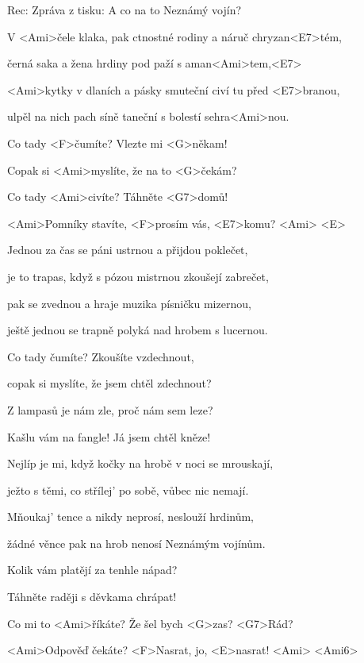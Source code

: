 

Rec: Zpráva z tisku:  A co na to Neznámý vojín?

\zs
V <Ami>čele klaka, pak ctnostné rodiny a náruč chryzan<E7>tém,

černá saka a žena hrdiny pod paží s aman<Ami>tem,<E7>

<Ami>kytky v dlaních a pásky smuteční civí tu před <E7>branou,

ulpěl na nich pach síně taneční s bolestí sehra<Ami>nou.
\ks

\zr
Co tady <F>čumíte? Vlezte mi <G>někam!

Copak si <Ami>myslíte, že na to <G>čekám?

Co tady <Ami>civíte? Táhněte <G7>domů!

<Ami>Pomníky stavíte, <F>prosím vás, <E7>komu? <Ami> <E>
\kr

\zs
Jednou za čas se páni ustrnou a přijdou poklečet,

je to trapas, když s pózou mistrnou zkoušejí zabrečet,

pak se zvednou a hraje muzika písničku mizernou,

ještě jednou se trapně polyká nad hrobem s lucernou.
\ks

\zr
Co tady čumíte? Zkoušíte vzdechnout,

copak si myslíte, že jsem chtěl zdechnout?

Z lampasů je nám zle, proč nám sem leze?

Kašlu vám na fangle! Já jsem chtěl kněze!
\kr

\zs
Nejlíp je mi, když kočky na hrobě v noci se mrouskají,

ježto s těmi, co střílej' po sobě, vůbec nic nemají.

Mňoukaj' tence a nikdy neprosí, neslouží hrdinům,

žádné věnce pak na hrob nenosí Neznámým vojínům.
\ks

\zr
Kolik vám platějí za tenhle nápad?

Táhněte raději s děvkama chrápat!

Co mi to <Ami>říkáte? Že šel bych <G>zas? <G7>Rád?

<Ami>Odpověď čekáte? <F>Nasrat, jo, <E>nasrat! <Ami> <Ami6>
\kr

\kp
